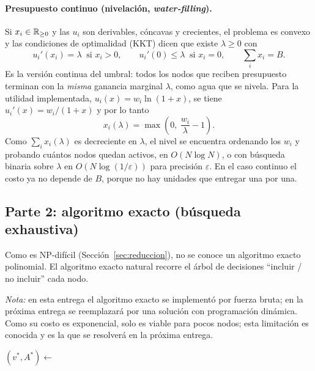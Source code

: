 \paragraph{Presupuesto continuo (nivelación, \emph{water-filling}).} Si $x_i\in\mathbb{R}_{\ge0}$ y las $u_i$ son derivables, cóncavas y crecientes, el problema es convexo y las condiciones de optimalidad (KKT) dicen que existe $\lambda\ge 0$ con
\[
u_i'(x_i)=\lambda \ \text{ si } x_i>0, \qquad u_i'(0)\le\lambda \ \text{ si } x_i=0, \qquad \sum_i x_i = B .
\]
Es la versión continua del umbral: todos los nodos que reciben presupuesto terminan con la \emph{misma} ganancia marginal $\lambda$, como agua que se nivela. Para la utilidad implementada, $u_i(x)=w_i\ln(1+x)$, se tiene $u_i'(x)=w_i/(1+x)$ y por lo tanto
\[
x_i(\lambda)=\max\!\left(0,\ \frac{w_i}{\lambda}-1\right).
\]
Como $\sum_i x_i(\lambda)$ es decreciente en $\lambda$, el nivel se encuentra ordenando los $w_i$ y probando cuántos nodos quedan activos, en $O(N\log N)$, o con búsqueda binaria sobre $\lambda$ en $O(N\log(1/\varepsilon))$ para precisión $\varepsilon$. En el caso continuo el costo ya no depende de $B$, porque no hay unidades que entregar una por una.

\subsection{Parte 2: algoritmo exacto (búsqueda exhaustiva)}\label{sec:exacto}

Como \SEL{} es NP-difícil (Sección~\ref{sec:reduccion}), no se conoce un algoritmo exacto polinomial. El algoritmo exacto natural recorre el árbol de decisiones ``incluir / no incluir'' cada nodo.

\emph{Nota:} en esta entrega el algoritmo exacto se implementó por fuerza bruta; en la próxima entrega se reemplazará por una solución con programación dinámica. Como su costo es exponencial, solo es viable para pocos nodos; esta limitación es conocida y es la que se resolverá en la próxima entrega.

\begin{algorithm}[H]
\caption{\textsc{SelecciónExacta}$(V, f, k)$}\label{alg:exacto}
\BlankLine
{}
\BlankLine
$(v^*, A^*) \leftarrow$  
\;
\end{algorithm}


